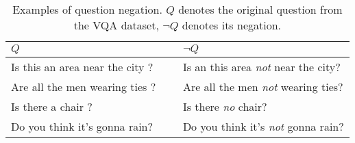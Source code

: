 \begin{table}[t]
    \centering
    \caption{Examples of question negation. $Q$ denotes the original question from the VQA dataset, $\neg Q$ denotes its negation.}
    \begin{tabular}{p{0.5\linewidth} p{0.5\linewidth}}
        \toprule
        \textbf{$Q$} & \textbf{$\neg Q$} \\
        \toprule 
        Is this an area near the city ? & Is an this area \textit{not} near the city?\\
        Are all the men wearing ties ? & Are all the men \textit{not} wearing ties?\\
        Is there a chair ? & Is there \textit{no} chair?\\
        Do you think it's gonna rain? & Do you think it's \textit{not} gonna rain?\\
        \bottomrule
    \end{tabular}
    \label{tab:Q_neg}
\end{table}